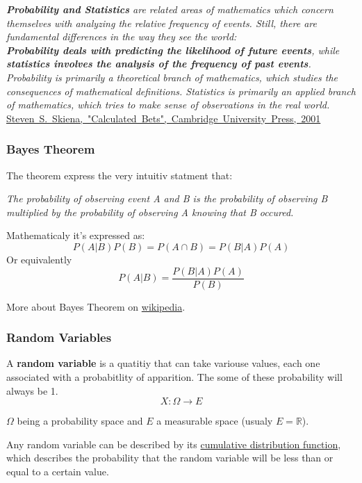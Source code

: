 \documentclass[a4paper,11pt,twoside]{article}
\newcommand*{\signed}[1]{%
  \unskip\hspace*{1em plus 1fill}%
  \nolinebreak[3]\hspace*{\fill}\mbox{#1}
}
\def \be {\begin{equation}}
\def \ee {\end{equation}}
\begin{document}
\begin{framed}
{\it {\bf Probability and Statistics} are related areas of mathematics which concern themselves with analyzing the relative frequency of events. Still, there are fundamental differences in the way they see the world:\\
\textbf{Probability deals with predicting the likelihood of future events}, while \textbf{statistics involves the analysis of the frequency of past events}. \\  
Probability is primarily a theoretical branch of mathematics, which studies the consequences of mathematical definitions. Statistics is primarily an applied branch of mathematics, which tries to make sense of observations in the real world.}
\signed{\href{http://www3.cs.stonybrook.edu/~skiena/jaialai/excerpts/node12.html}{Steven S. Skiena, "Calculated Bets", Cambridge University Press, 2001}}
\end{framed}

\subsubsection{Bayes Theorem}
The theorem express the very intuitiv statment that:

{\it The probability of observing event A and B is the probability of observing B multiplied by the probability of observing A knowing that B occured.}

Mathematicaly it's expressed as: 
\be
P(A\vert B)P(B)=P(A\cap B)=P(B\vert A)P(A)
\ee
Or equivalently
\be
P(A|B)={\frac  {P(B|A)P(A)}{P(B)}}
\ee

More about Bayes Theorem on \href{https://en.wikipedia.org/wiki/Bayes_theorem}{wikipedia}.

\subsubsection{Random Variables}
A \textbf{random variable} is a quatitiy that can take variouse values, each one associated with a probabitlity of apparition. The some of these probability will always be 1.
\be
X\colon \Omega \to E
\ee

$\Omega$ being a probability space and $E$ a measurable space (usualy $E = \mathbb{R}$).

Any random variable can be described by its \href{https://en.wikipedia.org/wiki/Cumulative_distribution_function}{cumulative distribution function}, which describes the probability that the random variable will be less than or equal to a certain value.
\end{document}
